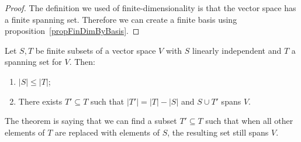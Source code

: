 \documentclass[../Main.tex]{subfiles}
\begin{document}
\begin{proof}
    The definition we used of finite-dimensionality is that the vector space has a finite spanning set. Therefore we can create a finite basis using proposition~\ref{propFinDimByBasis}.
\end{proof}
\begin{theorem}
    Let $S, T$ be finite subsets of a vector space $V$ with $S$ linearly independent and $T$ a spanning set for $V$. Then:
    \begin{enumerate}
        \item $|S| \leq |T|$;
        \item There exists $T' \subseteq T$ such that $|T'| = |T| - |S|$ and $S \cup T'$ spans $V$.
    \end{enumerate}
    \label{thmSteinitzExchange}
\end{theorem}
The theorem is saying that we can find a subset $T' \subseteq T$ such that when all other elements of $T$ are replaced with elements of $S$, the resulting set still spans $V$.
\end{document}
